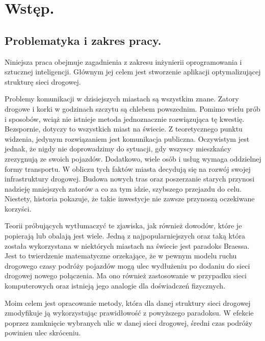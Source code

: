 \documentclass[twoside,12pt]{report}
\begin{document}


\tableofcontents	%

\chapter{Wstęp.} \label{rozdz.wstep} 

\section{Problematyka i zakres pracy.}

Niniejsza praca obejmuje zagadnienia z zakresu inżynierii oprogramowania i sztucznej inteligencji. Głównym jej celem jest stworzenie aplikacji optymalizującej strukturę sieci drogowej.

Problemy komunikacji w dzisiejszych miastach są wszystkim znane. Zatory drogowe i korki w godzinach szczytu są chlebem powszednim. Pomimo wielu prób i sposobów, wciąż nie istnieje metoda jednoznacznie rozwiązująca tę kwestię. Bezspornie, dotyczy to wszystkich miast na świecie. Z teoretycznego punktu widzenia, jedynym rozwiązaniem jest komunikacja publiczna. Oczywistym jest jednak, że nigdy nie doprowadzimy do sytuacji, gdy wszyscy mieszkańcy zrezygnują ze swoich pojazdów. Dodatkowo, wiele osób i usług wymaga oddzielnej formy transportu. W obliczu tych faktów miasta decydują się na rozwój swojej infrastruktury drogowej. Budowa nowych tras oraz poszerzanie starych przynosi nadzieję mniejszych zatorów a co za tym idzie, szybszego przejazdu do celu. Niestety, historia pokazuje, że takie inwestycje nie zawsze przynoszą oczekiwane korzyści.

Teorii próbujących wytłumaczyć te zjawiska, jak również dowodów, które je popierają lub obalają jest wiele. Jedną z najpopularniejszych oraz taką która została wykorzystana w niektórych miastach na świecie jest paradoks Braessa\cite{braess}. Jest to twierdzenie matematyczne orzekające, że w pewnym modelu ruchu drogowego czasy podróży pojazdów mogą ulec wydłużeniu po dodaniu do sieci drogowej nowego połączenia. Ma ono również  zastosowanie w przypadku  sieci komputerowych oraz istnieją jego analogie dla doświadczeń fizycznych.

Moim celem jest opracowanie metody, która dla danej struktury sieci drogowej zmodyfikuje ją wykorzystując prawidłowość z powyższego paradoksu. W efekcie poprzez zamknięcie wybranych ulic w danej sieci drogowej, średni czas podróży powinien ulec skróceniu.
\end{document}

